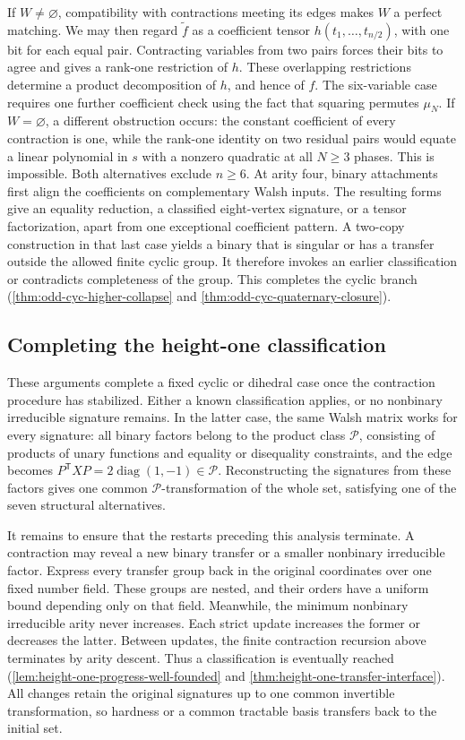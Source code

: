 \documentclass[11pt,letterpaper,onecolumn]{article}
\theoremstyle{plain}
\theoremstyle{definition}
\theoremstyle{remark}
\newcommand{\cP}{\mathscr P}
\newcommand{\diag}{\operatorname{diag}}
\begin{document}
If \(W\ne\varnothing\), compatibility with contractions meeting its
edges makes \(W\) a perfect matching. We may then regard
\(\widetilde f\) as a coefficient tensor \(h(t_1,\ldots,t_{n/2})\),
with one bit for each equal pair. Contracting variables from two pairs
forces their bits to agree and gives a rank-one restriction of \(h\).
These overlapping restrictions determine a product decomposition of
\(h\), and hence of \(f\). The six-variable case requires one further
coefficient check using the fact that squaring permutes \(\mu_N\).
If \(W=\varnothing\), a different obstruction occurs: the constant
coefficient of every contraction is one, while the rank-one identity on
two residual pairs would equate a linear polynomial in \(s\) with a
nonzero quadratic at all \(N\ge3\) phases. This is impossible. Both
alternatives exclude \(n\ge6\). At arity four, binary attachments first
align the coefficients on complementary Walsh inputs. The resulting
forms give an equality reduction, a classified eight-vertex signature,
or a tensor factorization, apart from one exceptional coefficient
pattern. A two-copy construction in that last case yields a binary
that is singular or has a transfer outside the allowed finite cyclic
group. It therefore invokes an earlier classification or contradicts
completeness of the group. This completes the cyclic branch (\cref{thm:odd-cyc-higher-collapse} and
\cref{thm:odd-cyc-quaternary-closure}).

\subsection{Completing the height-one classification}

These arguments complete a fixed cyclic or dihedral case once the
contraction procedure has stabilized. Either a known classification
applies, or no nonbinary irreducible signature remains. In the latter
case, the same Walsh matrix works for every signature: all binary
factors belong to the product class \(\cP\), consisting of products of
unary functions and equality or disequality constraints, and the edge
becomes \(P^{\mathsf T}XP=2\diag(1,-1)\in\cP\). Reconstructing the
signatures from these factors gives one common \(\cP\)-transformation
of the whole set, satisfying one of the seven structural alternatives.

It remains to ensure that the restarts preceding this analysis terminate.
A contraction may reveal a new binary transfer or a smaller nonbinary
irreducible factor. Express every transfer group
back in the original coordinates over one fixed number field. These
groups are nested, and their orders have a uniform bound depending only
on that field. Meanwhile, the minimum nonbinary irreducible arity never
increases. Each strict update increases the former or decreases the
latter. Between updates, the finite contraction recursion above
terminates by arity descent. Thus a classification is eventually reached
(\cref{lem:height-one-progress-well-founded} and
\cref{thm:height-one-transfer-interface}). All changes retain the
original signatures up to one common invertible transformation, so
hardness or a common tractable basis transfers back to the initial set.
\end{document}
